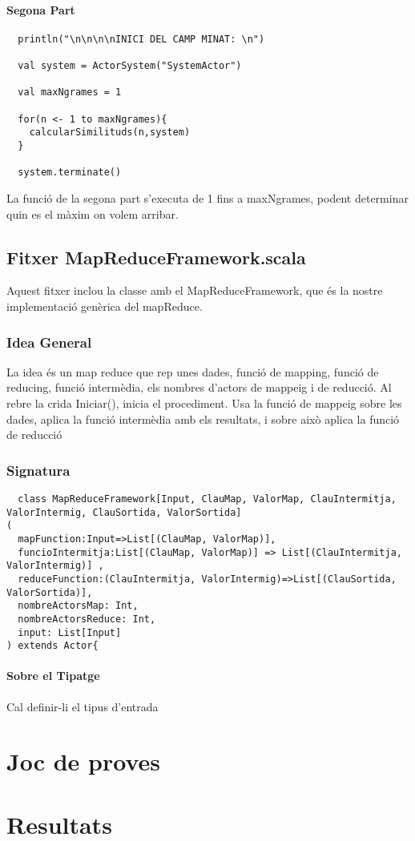 \documentclass[11pt,a4paper,twoside]{report}
\begin{document}
\subsubsection{Segona Part}

\begin{lstlisting}
  println("\n\n\n\nINICI DEL CAMP MINAT: \n")

  val system = ActorSystem("SystemActor")

  val maxNgrames = 1

  for(n <- 1 to maxNgrames){
    calcularSimilituds(n,system)
  }

  system.terminate()
\end{lstlisting}

La funció de la segona part s'executa de 1 fins a maxNgrames, podent determinar quin es el màxim on volem arribar.


\section{Fitxer MapReduceFramework.scala}

Aquest fitxer inclou la classe amb el MapReduceFramework, que és la nostre implementació genèrica del mapReduce.

\subsection{Idea General}
La idea és un map reduce que rep unes dades, funció de mapping, funció de reducing, funció intermèdia, els nombres d'actors de mappeig i de reducció.
Al rebre la crida Iniciar(), inicia el procediment. Usa la funció de mappeig sobre les dades, aplica la funció intermèdia amb els resultats, i sobre això aplica la funció de reducció

\subsection{Signatura}

\begin{lstlisting}
  class MapReduceFramework[Input, ClauMap, ValorMap, ClauIntermitja, ValorIntermig, ClauSortida, ValorSortida]
(
  mapFunction:Input=>List[(ClauMap, ValorMap)],
  funcioIntermitja:List[(ClauMap, ValorMap)] => List[(ClauIntermitja, ValorIntermig)] ,
  reduceFunction:(ClauIntermitja, ValorIntermig)=>List[(ClauSortida, ValorSortida)],
  nombreActorsMap: Int,
  nombreActorsReduce: Int,
  input: List[Input]
) extends Actor{
\end{lstlisting}

\subsubsection{Sobre el Tipatge}

Cal definir-li el tipus d'entrada






\chapter{Joc de proves}

\chapter{Resultats}
\end{document}
